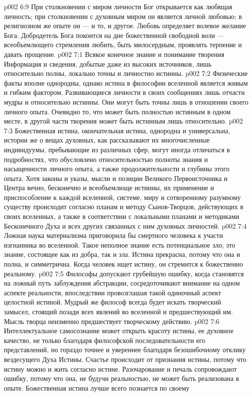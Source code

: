 \vs p002 6:9 \pc При столкновении с миром личности Бог открывается как любящая личность; при столкновении с духовным миром он является личной любовью; в религиозном же опыте он --- и то, и другое. Любовь определяет волевое желание Бога. Добродетель Бога покоится на дне божественной свободной воли --- всеобъемлющего стремления любить, быть милосердным, проявлять терпение и давать прощение.
\vs p002 7:1 Всякое конечное знание и понимание творения  Информация и сведения, добытые даже из высоких источников, лишь относительно полны, локально точны и личностно истинны.
\vs p002 7:2 Физические факты вполне однородны, однако истина в философии вселенной является живым и гибким фактором. Развивающиеся личности в своих сообщениях лишь отчасти мудры и относительно истинны. Они могут быть точны лишь в отношении своего личного опыта. Очевидно то, что может быть полностью истинным в одном месте, в другой части творения может быть истинным лишь относительно.
\vs p002 7:3 Божественная истина, окончательная истина, однородна и универсальна, истории же о вещах духовных, как рассказывают их многочисленные индивидуумы, пребывающие из различных сфер, могут иногда отличаться в подробностях, что обусловлено относительностью полноты знания и насыщенности личного опыта, а также продолжительности и глубины этого опыта. Хотя законы и указы, мысли и позиции Великого Первоисточника и Центра вечно, бесконечно и всеобъемлюще истинны, их применение и приспособление к каждой вселенной, системе, миру и сотворенному разумному существу происходит согласно планам и методу Сынов\hyp{}Творцов, действующих в своих вселенных, а также в соответствии с локальными планами и методиками Бесконечного Духа и всех других связанных с ним духовных личностей.
\vs p002 7:4 \pc Ложная наука материализма приговорила бы смертного человека к участи изгнанника во вселенной. Такое неполное знание есть потенциальное зло; это знание, состоящее как из добра, так и зла. Истина прекрасна, потому что она и полна, и симметрична. Когда человек ищет истину, он стремится к божественно реальному.
\vs p002 7:5 Философы допускают грубейшую ошибку, когда становятся на ложный путь заблуждения абстракции, сосредоточивают внимание на одном аспекте реальности, впоследствии провозглашая такой одиночный аспект целостной истиной. Мудрый же философ всегда будет искать творческий замысел, стоящий позади всех явлений во вселенной и предшествующий им. Мысль творца неизменно предшествует творческому действию.
\vs p002 7:6 Интеллектуальное самосознание может открыть красоту истины, ее духовное качество, не только благодаря философской последовательности его представлений, но гораздо точнее и увереннее благодаря безошибочному отклику вездесущего Духа Истины. Счастье происходит от признания истины, потому что истину можно  и жить согласно истине. Разочарование и печаль сопровождают ошибку, потому что она, не будучи реальностью, не может быть реализована в опыте. Божественная истина лучше всего познается по своему 
